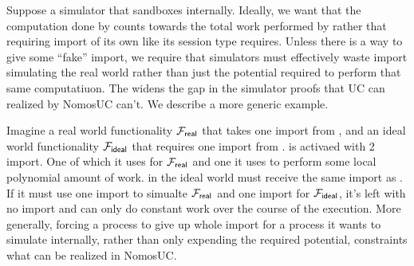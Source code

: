 Suppose a simulator \Sim that sandboxes \Fro internally. 
Ideally, we want that the computation done by \Fro counts towards the total work performed by \Sim rather that requiring import of its own like its session type requires.
Unless there is a way to give \Fro some ``fake'' import, we require that simulators must effectively waste import simulating the real world rather than just the potential required to perform that same computatiuon.
The widens the gap in the simulator proofs that UC can realized by NomosUC can't.
We describe a more generic example.

Imagine a real world functionality $\mathcal{F}_{\mathsf{real}}$ that takes one import from \A, and an ideal world functionality $\mathcal{F}_{\mathsf{ideal}}$ that requires one import from \Sim.
\A is activaed with 2 import. One of which it uses for $\mathcal{F}_{\mathsf{real}}$ and one it uses to perform some local polynomial amount of work.
\Sim in the ideal world must receive the same import as \A. If it must use one import to simualte $\mathcal{F}_{\mathsf{real}}$ and one import for $\mathcal{F}_{\mathsf{ideal}}$, it's left with no import and can only do constant work over the course of the execution.
More generally, forcing a process to give up whole import for a process it wants to simulate internally, rather than only expending the required potential, constraints what can be realized in NomosUC.


